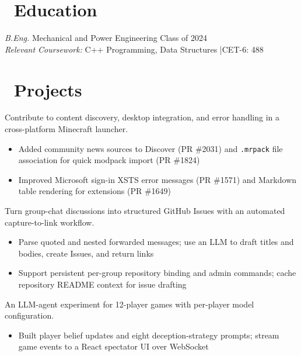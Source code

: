 \documentclass{resume}
\begin{document}


\section{\faGraduationCap\ Education}
\textit{B.Eng.} Mechanical and Power Engineering \hfill Class of 2024\\
\textit{Relevant Coursework:} C++ Programming, Data Structures \quad|\quad CET-6: 488

\section{\faUsers\ Projects}

Contribute to content discovery, desktop integration, and error handling in a cross-platform Minecraft launcher.
\begin{itemize}
  \item Added community news sources to Discover (PR \#2031) and \texttt{.mrpack} file association for quick modpack import (PR \#1824)
  \item Improved Microsoft sign-in XSTS error messages (PR \#1571) and Markdown table rendering for extensions (PR \#1649)
\end{itemize}

Turn group-chat discussions into structured GitHub Issues with an automated capture-to-link workflow.
\begin{itemize}
  \item Parse quoted and nested forwarded messages; use an LLM to draft titles and bodies, create Issues, and return links
  \item Support persistent per-group repository binding and admin commands; cache repository README context for issue drafting
\end{itemize}

An LLM-agent experiment for 12-player games with per-player model configuration.
\begin{itemize}
  \item Built player belief updates and eight deception-strategy prompts; stream game events to a React spectator UI over WebSocket
\end{itemize}
\end{document}

